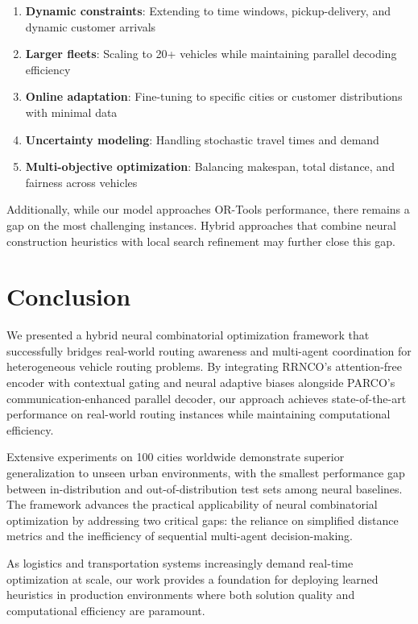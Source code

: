 \documentclass[lettersize,journal]{IEEEtran}
\begin{document}
\begin{enumerate}
\item \textbf{Dynamic constraints}: Extending to time windows, pickup-delivery, and dynamic customer arrivals
\item \textbf{Larger fleets}: Scaling to 20+ vehicles while maintaining parallel decoding efficiency
\item \textbf{Online adaptation}: Fine-tuning to specific cities or customer distributions with minimal data
\item \textbf{Uncertainty modeling}: Handling stochastic travel times and demand
\item \textbf{Multi-objective optimization}: Balancing makespan, total distance, and fairness across vehicles
\end{enumerate}

Additionally, while our model approaches OR-Tools performance, there remains a gap on the most challenging instances. Hybrid approaches that combine neural construction heuristics with local search refinement may further close this gap.

\section{Conclusion}

We presented a hybrid neural combinatorial optimization framework that successfully bridges real-world routing awareness and multi-agent coordination for heterogeneous vehicle routing problems. By integrating RRNCO's attention-free encoder with contextual gating and neural adaptive biases alongside PARCO's communication-enhanced parallel decoder, our approach achieves state-of-the-art performance on real-world routing instances while maintaining computational efficiency.

Extensive experiments on 100 cities worldwide demonstrate superior generalization to unseen urban environments, with the smallest performance gap between in-distribution and out-of-distribution test sets among neural baselines. The framework advances the practical applicability of neural combinatorial optimization by addressing two critical gaps: the reliance on simplified distance metrics and the inefficiency of sequential multi-agent decision-making.

As logistics and transportation systems increasingly demand real-time optimization at scale, our work provides a foundation for deploying learned heuristics in production environments where both solution quality and computational efficiency are paramount.
\end{document}
